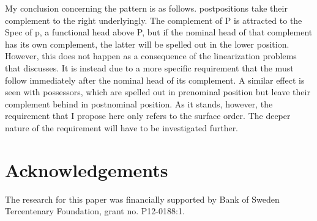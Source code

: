 \documentclass[output=paper]{LSP/langsci}
\begin{document}
My conclusion concerning the  pattern is as follows.  postpositions take their complement to the right underlyingly. The complement of P is attracted to the Spec of p, a functional head above P, but if the nominal head of that complement has its own complement, the latter will be spelled out in the lower position. However, this does not happen as a consequence of the linearization problems that \citet{Sheehan2009} discusses. It is instead due to a more specific requirement that the  must follow immediately after the nominal head of its complement. A similar effect is seen with possessors, which are spelled out in prenominal position but leave their complement behind in postnominal position. As it stands, however, the requirement that I propose here only refers to the surface order. The deeper nature of the requirement will have to be investigated further.


\section*{Acknowledgements}
The research for this paper was financially supported by Bank of Sweden Tercentenary Foundation, grant no. P12-0188:1. 


{\sloppy\printbibliography[heading=subbibliography,notkeyword=this]}
\end{document}
